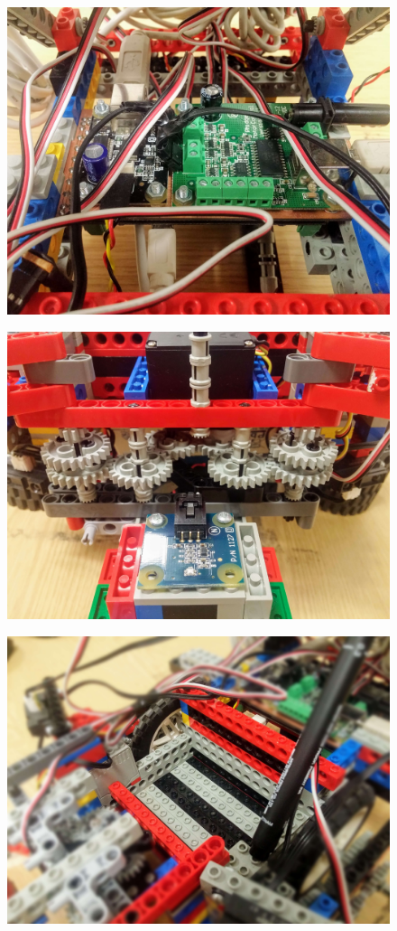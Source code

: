 \begin{figure}[ht]
    \centering
    \includegraphics[width=0.7\linewidth]{res/robot-pics/phidget-boards.jpg}
    \caption{}
    \label{fig:}
\end{figure}

\begin{figure}[ht]
    \centering
    \includegraphics[width=0.7\linewidth]{res/robot-pics/gripper-gear-train.jpg}
    \caption{}
    \label{fig:}
\end{figure}

\begin{figure}[ht]
    \centering
    \includegraphics[width=0.7\linewidth]{res/robot-pics/battery-slot.jpg}
    \caption{}
    \label{fig:}
\end{figure}

